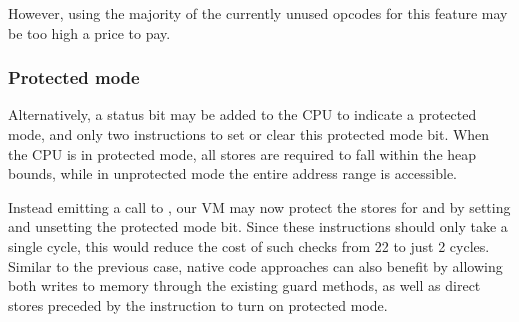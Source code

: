 However, using the majority of the currently unused opcodes for this feature may be too high a price to pay.

\subsubsection{Protected mode}
Alternatively, a status bit may be added to the CPU to indicate a protected mode, and only two instructions to set or clear this protected mode bit. When the CPU is in protected mode, all stores are required to fall within the heap bounds, while in unprotected mode the entire address range is accessible.

Instead emitting a call to , our VM may now protect the stores for  and  by setting and unsetting the protected mode bit. Since these instructions should only take a single cycle, this would reduce the cost of such checks from 22 to just 2 cycles. Similar to the previous case, native code approaches can also benefit by allowing both writes to memory through the existing guard methods, as well as direct stores preceded by the instruction to turn on protected mode.
